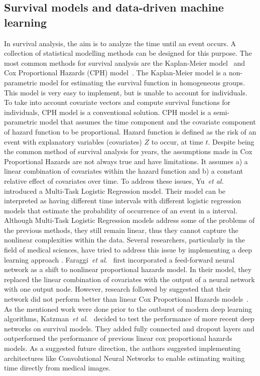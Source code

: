 \subsection{Survival models and data-driven machine learning}
In survival analysis, the aim is to analyze the time until an event occurs. A collection of statistical modelling methods can be designed for this purpose. The most common methods for survival analysis are the Kaplan-Meier model~\citep{kaplan1958nonparametric} and Cox Proportional Hazards (CPH) model~\citep{cox1972regression}.
The Kaplan-Meier model is a non-parametric model for estimating the survival function in homogeneous groups. This model is very easy to implement, but is unable to account for individuals. To take into account covariate vectors and compute survival functions for individuals, CPH model is a conventional solution. CPH model is a semi-parametric model that assumes the time component and the covariate component of hazard function to be proportional. Hazard function is defined as the risk of an event with explanatory variables (covariates) $Z$ to occur, at time $t$. Despite being the common method of survival analysis for years, the assumptions made in Cox Proportional Hazards are not always true and have limitations. It assumes a) a linear combination of covariates within the hazard function and b) a constant relative effect of covariates over time.
To address these issues, Yu~\textit{et al.}~\cite{yu2011learning} introduced a Multi-Task Logistic Regression model. Their model can be interpreted as having different time intervals with different logistic regression models that estimate the probability of occurrence of an event in a interval. Although Multi-Task Logistic Regression models address some of the problems of the previous methods, they still remain linear, thus they cannot capture the nonlinear complexities within the data. Several researchers, particularly in the field of medical sciences, have tried to address this issue by implementing a deep learning approach \citep{faraggi1995neural,katzman2016deep,luck2017deep}.
Faraggi~\textit{et al.}~\cite{faraggi1995neural} first incorporated a feed-forward neural network as a shift to nonlinear proportional hazards model. In their model, they replaced the linear combination of covariates with the output of a neural network with one output node. However, research followed by suggested that their network did not perform better than linear Cox Proportional Hazards models~\citep{mariani1997prognostic}. As the mentioned work were done prior to the outburst of modern deep learning algorithms, Katzman~\textit{et al.}~\cite{katzman2016deep} decided to test the performance of more recent deep networks on survival models. They added fully connected and dropout layers and outperformed the performance of previous linear cox proportional hazards models. As a suggested future direction, the authors suggested implementing architectures like Convolutional Neural Networks to enable estimating waiting time directly from medical images. 

